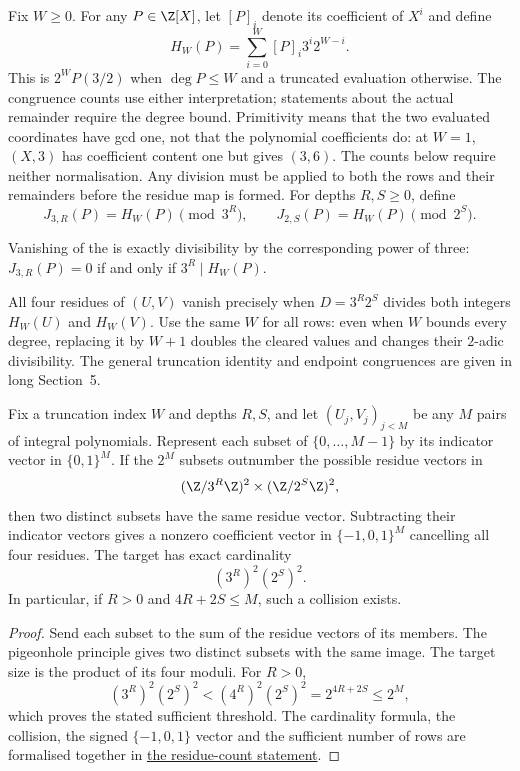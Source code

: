 \documentclass[11pt]{article}
\begin{document}
Fix $W\ge0$. For any $P\in\Z[X]$, let $[P]_i$ denote its coefficient
of $X^i$ and define
\[
 H_W(P)=\sum_{i=0}^W[P]_i3^i2^{W-i}.
\]
This is $2^WP(3/2)$ when $\deg P\le W$ and a truncated evaluation
otherwise. The congruence counts use either interpretation; statements
about the actual remainder require the degree bound.
Primitivity means that the two evaluated coordinates have gcd one,
not that the polynomial coefficients do: at $W=1$, $(X,3)$ has
coefficient content one but gives $(3,6)$. The counts below require
neither normalisation. Any division must be applied to both the rows
and their remainders before the residue map is formed.
For depths $R,S\ge0$, define
\[
 J_{3,R}(P)=H_W(P)\pmod{3^R},\qquad
 J_{2,S}(P)=H_W(P)\pmod{2^S}.
\]
\begin{lemma}\label{res:bottomjet}
Vanishing of the
is exactly divisibility by the corresponding power of three:
$J_{3,R}(P)=0$ if and only if $3^R\mid H_W(P)$.
\end{lemma}

All four residues of $(U,V)$ vanish precisely when $D=3^R2^S$ divides both
integers $H_W(U)$ and $H_W(V)$. Use the same $W$ for all rows: even when
$W$ bounds every degree, replacing it by $W+1$ doubles the cleared values
and changes their $2$-adic divisibility. The general truncation identity
and endpoint congruences are given in long Section~5.


\begin{theorem}\label{res:jetkernel}
Fix a truncation index \(W\) and depths \(R,S\), and let \((U_j,V_j)_{j<M}\) be any \(M\)
pairs of integral polynomials. Represent each subset of
\(\{0,\dots,M-1\}\) by its indicator vector in \(\{0,1\}^M\).
If the \(2^M\) subsets outnumber the possible residue vectors in
\[
 (\Z/3^R\Z)^2\times(\Z/2^S\Z)^2,
\]
then two distinct subsets have the same residue vector.  Subtracting their
indicator vectors gives a nonzero coefficient vector in
\(\{-1,0,1\}^M\) cancelling all four residues.  The target has exact cardinality
\[
 (3^R)^2(2^S)^2.
\]
In particular, if \(R>0\) and \(4R+2S\le M\), such a collision exists.
\end{theorem}

\begin{proof}
Send each subset to the sum of the residue vectors of its members.
The pigeonhole principle gives two distinct subsets with the same
image. The target size is the product of its four moduli.  For \(R>0\),
\[
 (3^R)^2(2^S)^2<(4^R)^2(2^S)^2=2^{4R+2S}\le2^M,
\]
which proves the stated sufficient threshold.
The cardinality formula, the collision, the signed \(\{-1,0,1\}\) vector and
the sufficient number of rows are formalised together in \href{https://github.com/wcook04/plectis-erdos/blob/f36a98bf3d3e6f65f1074e3b800e3293d5b8a51a/ErdosProblems/Erdos1049/PaperFiniteAssembliesR7.lean#L248}{the residue-count statement}.
\end{proof}
\end{document}
